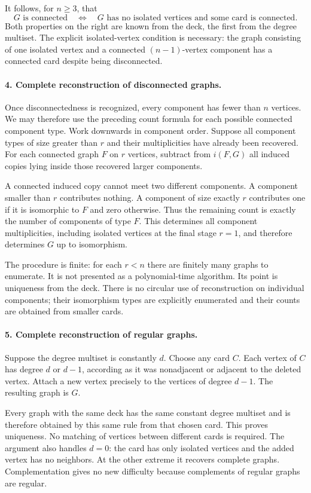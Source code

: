 \documentclass[11pt]{article}
\begin{document}
It follows, for $n\ge3$, that
\[
 G\text{ is connected}\quad\Longleftrightarrow\quad
 G\text{ has no isolated vertices and some card is connected}.
\]
Both properties on the right are known from the deck, the first from the degree multiset. The explicit isolated-vertex condition is necessary: the graph consisting of one isolated vertex and a connected $(n-1)$-vertex component has a connected card despite being disconnected.

\paragraph{4. Complete reconstruction of disconnected graphs.}
Once disconnectedness is recognized, every component has fewer than $n$ vertices. We may therefore use the preceding count formula for each possible connected component type. Work downwards in component order. Suppose all component types of size greater than $r$ and their multiplicities have already been recovered. For each connected graph $F$ on $r$ vertices, subtract from $i(F,G)$ all induced copies lying inside those recovered larger components.

A connected induced copy cannot meet two different components. A component smaller than $r$ contributes nothing. A component of size exactly $r$ contributes one if it is isomorphic to $F$ and zero otherwise. Thus the remaining count is exactly the number of components of type $F$. This determines all component multiplicities, including isolated vertices at the final stage $r=1$, and therefore determines $G$ up to isomorphism.

The procedure is finite: for each $r<n$ there are finitely many graphs to enumerate. It is not presented as a polynomial-time algorithm. Its point is uniqueness from the deck. There is no circular use of reconstruction on individual components; their isomorphism types are explicitly enumerated and their counts are obtained from smaller cards.

\paragraph{5. Complete reconstruction of regular graphs.}
Suppose the degree multiset is constantly $d$. Choose any card $C$. Each vertex of $C$ has degree $d$ or $d-1$, according as it was nonadjacent or adjacent to the deleted vertex. Attach a new vertex precisely to the vertices of degree $d-1$. The resulting graph is $G$.

Every graph with the same deck has the same constant degree multiset and is therefore obtained by this same rule from that chosen card. This proves uniqueness. No matching of vertices between different cards is required. The argument also handles $d=0$: the card has only isolated vertices and the added vertex has no neighbors. At the other extreme it recovers complete graphs. Complementation gives no new difficulty because complements of regular graphs are regular.
\end{document}
